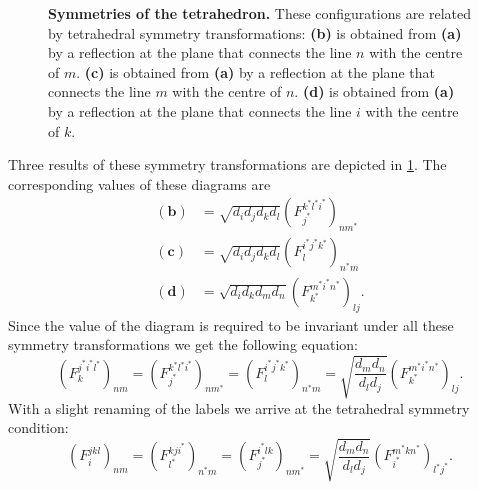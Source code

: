 \begin{figure}[t]
	\caption{\small \label{fig:tetrahedron}\textbf{Symmetries of the tetrahedron.} These configurations are related by tetrahedral symmetry transformations: \textbf{(b)} is obtained from \textbf{(a)} by a reflection at the plane that connects the line $n$ with the centre of $m$. \textbf{(c)} is obtained from \textbf{(a)} by a reflection at the plane that connects the line $m$ with the centre of $n$. \textbf{(d)} is obtained from \textbf{(a)} by a reflection at the plane that connects the line $i$ with the centre of $k$.}
\end{figure}

Three results of these symmetry transformations are depicted in \cref{fig:tetrahedron}. The corresponding values of these diagrams are
	\begin{align}
		\mathbf{(b)}&=\sqrt{d_id_jd_kd_l}\left(F_{j^*}^{k^*l^*i^*}\right)_{nm^*}\\
		\mathbf{(c)}&=\sqrt{d_id_jd_kd_l}\left(F_l^{i^*j^*k^*}\right)_{n^*m}\\
		\mathbf{(d)}&=\sqrt{d_id_kd_md_n}\left(F_{k^*}^{m^*i^*n^*}\right)_{lj}.
	\end{align}
Since the value of the diagram is required to be invariant under all these symmetry transformations we get the following equation:
	\begin{equation}
		\left(F_k^{j^*i^*l^*}\right)_{nm}=\left(F_{j^*}^{k^*l^*i^*}\right)_{nm^*}=\left(F_l^{i^*j^*k^*}\right)_{n^*m}=\sqrt{\frac{d_md_n}{d_ld_j}}\left(F_{k^*}^{m^*i^*n^*}\right)_{lj}.
	\end{equation}
With a slight renaming of the labels we arrive at the tetrahedral symmetry condition:
	\begin{equation}
		\label{eq:tetrahedralsymmetry}
		\left(F_i^{jkl}\right)_{nm}=\left(F_{l^*}^{kji^*}\right)_{n^*m}=\left(F_{j^*}^{i^*lk}\right)_{nm^*}=\sqrt{\frac{d_md_n}{d_ld_j}}\left(F_{i^*}^{m^*kn^*}\right)_{l^*j^*}.
	\end{equation}

